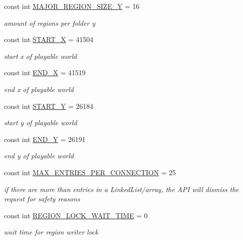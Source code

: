 \begin{DoxyCompactItemize}
const int \hyperlink{classCore_1_1Models_1_1Constants_ad49dbef4256b0be04e921acc8bcef4a8}{M\+A\+J\+O\+R\+\_\+\+R\+E\+G\+I\+O\+N\+\_\+\+S\+I\+Z\+E\+\_\+\+Y} = 16
\begin{DoxyCompactList}\small\item\em amount of regions per folder y \end{DoxyCompactList}\item 
const int \hyperlink{classCore_1_1Models_1_1Constants_a04216f06fce4df1266355ba32c59ac21}{S\+T\+A\+R\+T\+\_\+\+X} = 41504
\begin{DoxyCompactList}\small\item\em start x of playable world \end{DoxyCompactList}\item 
const int \hyperlink{classCore_1_1Models_1_1Constants_ab564a2138347d9c65862ffe4d80c6735}{E\+N\+D\+\_\+\+X} = 41519
\begin{DoxyCompactList}\small\item\em end x of playable world \end{DoxyCompactList}\item 
const int \hyperlink{classCore_1_1Models_1_1Constants_a0da8b0008fff8b2529d5a8e298b29e5f}{S\+T\+A\+R\+T\+\_\+\+Y} = 26184
\begin{DoxyCompactList}\small\item\em start y of playable world \end{DoxyCompactList}\item 
const int \hyperlink{classCore_1_1Models_1_1Constants_ae2cd96ff453731f63095739737f184b4}{E\+N\+D\+\_\+\+Y} = 26191
\begin{DoxyCompactList}\small\item\em end y of playable world \end{DoxyCompactList}\item 
const int \hyperlink{classCore_1_1Models_1_1Constants_a09b8f7514cdf1d440f7bbaff8fe843c2}{M\+A\+X\+\_\+\+E\+N\+T\+R\+I\+E\+S\+\_\+\+P\+E\+R\+\_\+\+C\+O\+N\+N\+E\+C\+T\+I\+O\+N} = 25
\begin{DoxyCompactList}\small\item\em if there are more than entries in a Linked\+List/array, the A\+P\+I will dismiss the request for safety reasons \end{DoxyCompactList}\item 
const int \hyperlink{classCore_1_1Models_1_1Constants_ae34c70369e0c6c6f34f5b5275625afdb}{R\+E\+G\+I\+O\+N\+\_\+\+L\+O\+C\+K\+\_\+\+W\+A\+I\+T\+\_\+\+T\+I\+M\+E} = 0
\begin{DoxyCompactList}\small\item\em wait time for region writer lock \end{DoxyCompactList}\item 

\end{DoxyCompactItemize}
